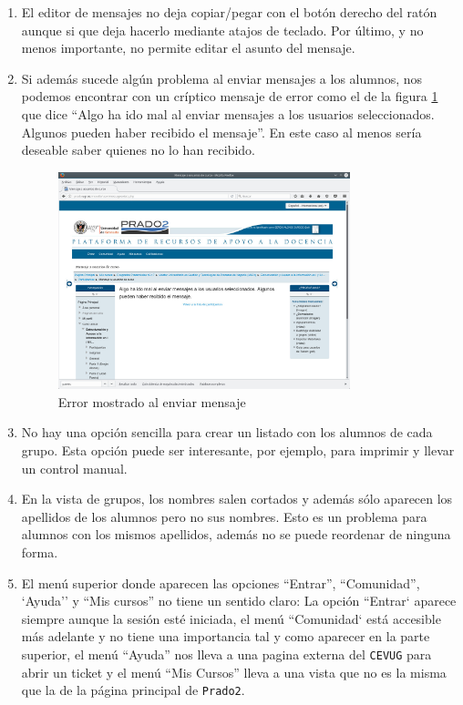 \begin{enumerate}
\item El editor de mensajes no deja copiar/pegar con el botón derecho del ratón aunque si que deja hacerlo mediante atajos de teclado. Por último, y no menos importante, no permite editar el asunto del mensaje.

\item Si además sucede algún problema al enviar mensajes a los alumnos, nos podemos encontrar con un críptico mensaje de error como el de la figura \ref{fig:pantallazoPradoMensaje2} que dice  ``Algo ha ido mal al enviar mensajes a los usuarios seleccionados. Algunos pueden haber recibido el mensaje''. En este caso al menos sería deseable saber quienes no lo han recibido.


\begin{figure}[h!]
\centering
\includegraphics[width=0.8\textwidth]{../screenshots/pantallazoPradoMensaje2}
\caption{Error mostrado al enviar mensaje}
\label{fig:pantallazoPradoMensaje2}
\end{figure}


\item No hay una opción sencilla para crear un listado con los alumnos de cada grupo. Esta  opción puede ser interesante, por ejemplo, para imprimir y llevar un control manual.

\item En la vista de grupos, los nombres salen cortados y además sólo aparecen los apellidos de los alumnos pero no sus nombres. Esto es un problema para alumnos con los mismos apellidos, además no se puede reordenar de ninguna forma.

\item El menú superior donde aparecen las opciones ``Entrar'', ``Comunidad'', `Ayuda'' y ``Mis cursos'' no tiene un sentido claro: La opción ``Entrar` aparece siempre aunque la sesión esté iniciada, el menú ``Comunidad` está accesible más adelante y no tiene una importancia tal y como aparecer en la parte superior, el menú ``Ayuda'' nos lleva a una pagina externa del \texttt{CEVUG} para abrir un ticket y el menú ``Mis Cursos'' lleva a una vista que no es la misma que la de la página principal de \texttt{Prado2}.


\end{enumerate}

